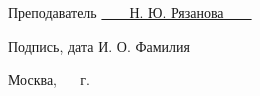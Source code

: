 \begin{titlepage}
\vspace{0.5cm}

\fontsize{12pt}{12pt}\selectfont
\noindent\textnormal{Преподаватель} \hspace{52mm}
\underline{\textnormal{\hphantom{~~~~~~~~~~~~~~~~~~~~~~~~~~~}}} \hspace{14mm}
\noindent\underline{\textnormal{~~~~Н. Ю. Рязанова~~~~}}

\vspace{2mm}
\noindent\textnormal{\hphantom{Студент}} \hspace{17mm}\noindent
\fontsize{8pt}{8pt}
\hphantom{Группа}\hspace{43mm}\textnormal{Подпись, дата} \hspace{30mm}\noindent\textnormal{И. О. Фамилия}

\vspace{0.5cm}

\fontsize{12pt}{12pt}\selectfont

\begin{center}
	\vfill
	Москва, ~\the\year
	~г.
\end{center}

\restoregeometry
\end{titlepage}
